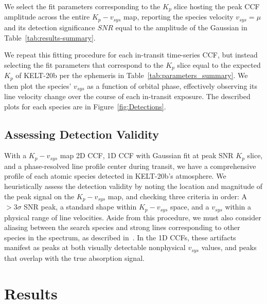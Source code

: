 \documentclass[twocolumn]{aastex631}
\begin{document}
            We select the fit parameters corresponding to the $K_p$ slice hosting the peak CCF amplitude across the entire $K_p-v_{sys}$ map, reporting the species velocity $v_{sys} = \mu$ and its detection significance $SNR$ equal to the amplitude of the Gaussian in Table~\ref{tab:results-summary}.
            
            We repeat this fitting procedure for each in-transit time-series CCF, but instead selecting the fit parameters that correspond to the $K_p$ slice equal to the expected $K_p$ of KELT-20b per the ephemeris in Table~\ref{tab:parameters_summary}. We then plot the species' $v_{sys}$ as a function of orbital phase, effectively observing its line velocity change over the course of each in-transit exposure. The described plots for each species are in Figure~\ref{fig:Detections}. 

        \subsection{Assessing Detection Validity}\label{subsec:Assessing Detection Results}
            With a ${K_p-v_{sys}}$ map 2D CCF, 1D CCF with Gaussian fit at peak SNR $K_p$ slice, and a phase-resolved line profile center during transit, we have a comprehensive profile of each atomic species detected in KELT-20b's atmosphere. We heuristically assess the detection validity by noting the location and magnitude of the peak signal on the ${K_p-v_{sys}}$ map, and checking three criteria in order: A $>{3\sigma}$ SNR peak, a standard shape within ${K_p-v_{sys}}$ space, and a $v_{sys}$ within a physical range of line velocities. Aside from this procedure, we must also consider aliasing between the search species and strong lines corresponding to other species in the spectrum, as described in~\citet{Borsato2023}. In the 1D CCFs, these artifacts manifest as peaks at both visually detectable nonphysical $v_{sys}$ values, and peaks that overlap with the true absorption signal.
            
            
    \section{Results}\label{sec:Results}
        
\end{document}
